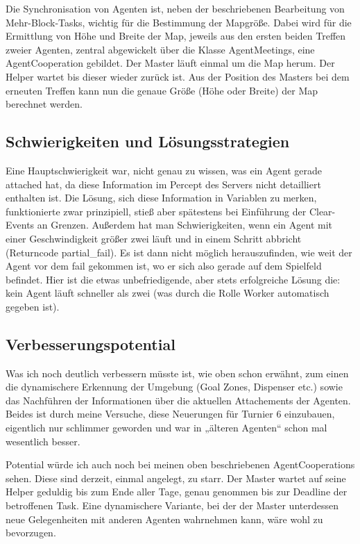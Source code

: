 \documentclass[runningheads]{llncs}
\begin{document}
	Die Synchronisation von Agenten ist, neben der beschriebenen Bearbeitung von Mehr-Block-Tasks, wichtig für die Bestimmung der Mapgröße. Dabei wird für die Ermittlung von Höhe und Breite der Map, jeweils aus den ersten beiden Treffen zweier Agenten, zentral abgewickelt über die Klasse AgentMeetings, eine AgentCooperation gebildet. Der Master läuft einmal um die Map herum. Der Helper wartet bis dieser wieder zurück ist. Aus der Position des Masters bei dem erneuten Treffen kann nun die genaue Größe (Höhe oder Breite) der Map berechnet werden. 
	
	\subsection{Schwierigkeiten und Lösungsstrategien}
	Eine Hauptschwierigkeit war, nicht genau zu wissen, was ein Agent gerade attached hat, da diese Information im Percept des Servers nicht detailliert enthalten ist. Die Lösung, sich diese Information in Variablen zu merken, funktionierte zwar prinzipiell, stieß aber spätestens bei Einführung der Clear-Events an Grenzen. Außerdem hat man Schwierigkeiten, wenn ein Agent mit einer Geschwindigkeit größer zwei läuft und in einem Schritt abbricht (Returncode partial\_fail). Es ist dann nicht möglich herauszufinden, wie weit der Agent vor dem fail gekommen ist, wo er sich also gerade auf dem Spielfeld befindet. Hier ist die etwas unbefriedigende, aber stets erfolgreiche Lösung die: kein Agent läuft schneller als zwei (was durch die Rolle Worker automatisch gegeben ist). 
	
	\subsection{Verbesserungspotential}
	Was ich noch deutlich verbessern müsste ist, wie oben schon erwähnt, zum einen die dynamischere Erkennung der Umgebung (Goal Zones, Dispenser etc.) sowie das Nachführen der Informationen über die aktuellen Attachements der Agenten. Beides ist durch meine Versuche, diese Neuerungen für Turnier 6 einzubauen, eigentlich nur schlimmer geworden und war in „älteren Agenten“ schon mal wesentlich besser.
	
	Potential würde ich auch noch bei meinen oben beschriebenen AgentCooperations sehen. Diese sind derzeit, einmal angelegt, zu starr. Der Master wartet auf seine Helper geduldig bis zum Ende aller Tage, genau genommen bis zur Deadline der betroffenen Task. Eine dynamischere Variante, bei der der Master unterdessen neue Gelegenheiten mit anderen Agenten wahrnehmen kann, wäre wohl zu bevorzugen.  
	
\end{document}
